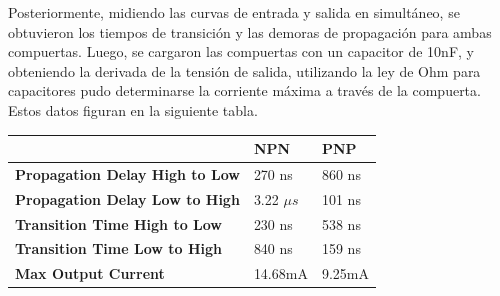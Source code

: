 Posteriormente, midiendo las curvas de entrada y salida en simult\'aneo, se obtuvieron los tiempos de transición y las demoras de propagación para ambas compuertas. Luego, se cargaron las compuertas con un capacitor de 10nF, y obteniendo la derivada de la tensión de salida, utilizando la ley de Ohm para capacitores pudo determinarse la corriente m\'axima a trav\'es de la compuerta. Estos datos figuran en la siguiente tabla.

\begin{table}[H]
\centering
\begin{tabular}{|l|l|l|}
\hline
                                       & \textbf{NPN} & \textbf{PNP} \\ \hline
\textbf{Propagation Delay High to Low} & 270 ns       & 860 ns       \\ \hline
\textbf{Propagation Delay Low to High} & 3.22 $\mu s$      & 101 ns       \\ \hline
\textbf{Transition Time High to Low}   & 230 ns       & 538 ns       \\ \hline
\textbf{Transition Time Low to High}   & 840 ns       & 159 ns       \\ \hline
\textbf{Max Output Current}            & 14.68mA      & 9.25mA       \\ \hline
\end{tabular}
\end{table}


